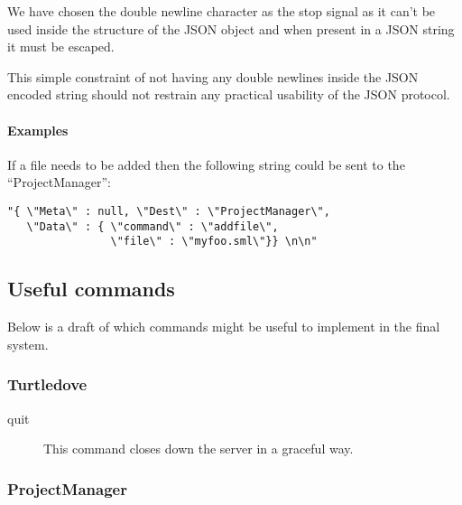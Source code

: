 We have chosen the double newline character as the stop signal as it can't be used
inside the structure of the JSON object and when present in a JSON string it
must be escaped. 

This simple constraint of not having any double newlines inside the JSON encoded
string should not restrain any practical usability of the JSON protocol.


\paragraph{Examples}

\begin{example} If a file needs to be added then the following string could be
  sent to the ``ProjectManager'':
\begin{verbatim}
"{ \"Meta\" : null, \"Dest\" : \"ProjectManager\",
   \"Data\" : { \"command\" : \"addfile\", 
                \"file\" : \"myfoo.sml\"}} \n\n"
\end{verbatim}
\end{example}


\subsection*{Useful commands}

 Below is a draft of which commands might be useful to implement in the final system. 

\subsubsection*{Turtledove}

\begin{description}
\item[quit] This command closes down the server in a graceful way.
\end{description}

\subsubsection*{ProjectManager }

